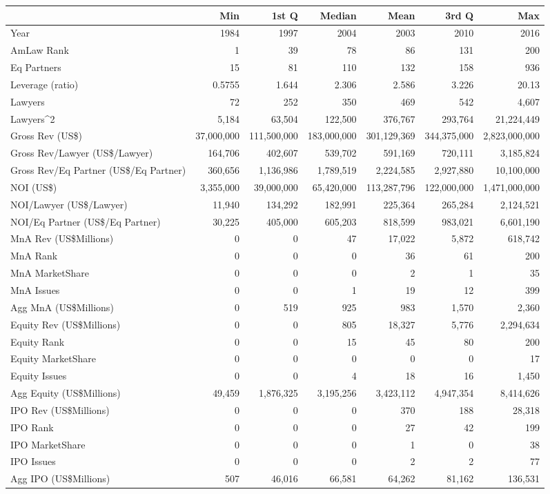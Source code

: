 \begin{table}[ht]
\centering
\begin{tabular}{lrrrrrr}
  \hline
 & Min & 1st Q & Median & Mean & 3rd Q & Max \\ 
  \hline
Year & 1984 & 1997 & 2004 & 2003 & 2010 & 2016 \\ 
  AmLaw Rank & 1 & 39 & 78 & 86 & 131 & 200 \\ 
  Eq Partners & 15 & 81 & 110 & 132 & 158 & 936 \\ 
  Leverage (ratio) & 0.5755 & 1.644 & 2.306 & 2.586 & 3.226 & 20.13 \\ 
  Lawyers & 72 & 252 & 350 & 469 & 542 & 4,607 \\ 
  Lawyers^2 & 5,184 & 63,504 & 122,500 & 376,767 & 293,764 & 21,224,449 \\ 
  Gross Rev (US\$) & 37,000,000 & 111,500,000 & 183,000,000 & 301,129,369 & 344,375,000 & 2,823,000,000 \\ 
  Gross Rev/Lawyer (US\$/Lawyer) & 164,706 & 402,607 & 539,702 & 591,169 & 720,111 & 3,185,824 \\ 
  Gross Rev/Eq Partner (US\$/Eq Partner) & 360,656 & 1,136,986 & 1,789,519 & 2,224,585 & 2,927,880 & 10,100,000 \\ 
  NOI (US\$) & 3,355,000 & 39,000,000 & 65,420,000 & 113,287,796 & 122,000,000 & 1,471,000,000 \\ 
  NOI/Lawyer (US\$/Lawyer) & 11,940 & 134,292 & 182,991 & 225,364 & 265,284 & 2,124,521 \\ 
  NOI/Eq Partner (US\$/Eq Partner) & 30,225 & 405,000 & 605,203 & 818,599 & 983,021 & 6,601,190 \\ 
  MnA Rev (US\$Millions) & 0 & 0 & 47 & 17,022 & 5,872 & 618,742 \\ 
  MnA  Rank & 0 & 0 & 0 & 36 & 61 & 200 \\ 
  MnA MarketShare & 0 & 0 & 0 & 2 & 1 & 35 \\ 
  MnA Issues & 0 & 0 & 1 & 19 & 12 & 399 \\ 
  Agg MnA (US\$Millions) & 0 & 519 & 925 & 983 & 1,570 & 2,360 \\ 
  Equity Rev (US\$Millions) & 0 & 0 & 805 & 18,327 & 5,776 & 2,294,634 \\ 
  Equity  Rank & 0 & 0 & 15 & 45 & 80 & 200 \\ 
  Equity MarketShare & 0 & 0 & 0 & 0 & 0 & 17 \\ 
  Equity Issues & 0 & 0 & 4 & 18 & 16 & 1,450 \\ 
  Agg Equity (US\$Millions) & 49,459 & 1,876,325 & 3,195,256 & 3,423,112 & 4,947,354 & 8,414,626 \\ 
  IPO Rev (US\$Millions) & 0 & 0 & 0 & 370 & 188 & 28,318 \\ 
  IPO  Rank & 0 & 0 & 0 & 27 & 42 & 199 \\ 
  IPO MarketShare & 0 & 0 & 0 & 1 & 0 & 38 \\ 
  IPO Issues & 0 & 0 & 0 & 2 & 2 & 77 \\ 
  Agg IPO (US\$Millions) & 507 & 46,016 & 66,581 & 64,262 & 81,162 & 136,531 \\ 
   \hline
\end{tabular}
\end{table}
